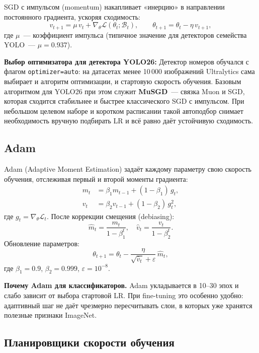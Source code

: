 \documentclass[10pt,a4paper]{report}
\numberwithin{equation}{chapter}
\numberwithin{figure}{chapter}
\numberwithin{table}{chapter}
\begin{document}
SGD с импульсом (momentum) накапливает «инерцию» в направлении
постоянного градиента, ускоряя сходимость:
\begin{equation}
  v_{t+1} = \mu\,v_t +
    \nabla_\theta\mathcal{L}(\theta_t;\mathcal{B}_t),
  \qquad
  \theta_{t+1} = \theta_t - \eta\,v_{t+1},
\end{equation}
где $\mu$~--- коэффициент импульса (типичное значение для
детекторов семейства YOLO~--- $\mu=0.937$).

\textbf{Выбор оптимизатора для детектора YOLO26:}
Детектор номеров обучался с флагом \texttt{optimizer=auto}: на датасетах
менее 10\,000 изображений Ultralytics сама выбирает и алгоритм
оптимизации, и стартовую скорость обучения. Базовым алгоритмом для
YOLO26 при этом служит \textbf{MuSGD}~--- связка Muon и SGD, которая
сходится стабильнее и быстрее классического SGD с импульсом. При
небольшом целевом наборе и коротком расписании такой автоподбор снимает
необходимость вручную подбирать LR и всё равно даёт устойчивую
сходимость.

\subsection{Adam}

Adam (Adaptive Moment Estimation) задаёт каждому параметру свою
скорость обучения, отслеживая первый и второй моменты градиента:
\begin{align}
  m_t &= \beta_1 m_{t-1} + (1-\beta_1)\,g_t, \\
  v_t &= \beta_2 v_{t-1} + (1-\beta_2)\,g_t^2,
\end{align}
где $g_t = \nabla_\theta\mathcal{L}_t$.
После коррекции смещения (debiasing):
\begin{equation}
  \hat{m}_t = \frac{m_t}{1-\beta_1^t},\quad
  \hat{v}_t = \frac{v_t}{1-\beta_2^t}.
\end{equation}
Обновление параметров:
\begin{equation}
  \theta_{t+1} = \theta_t -
    \frac{\eta}{\sqrt{\hat{v}_t}+\varepsilon}\,\hat{m}_t,
\end{equation}
где $\beta_1=0.9$, $\beta_2=0.999$, $\varepsilon=10^{-8}$.

\textbf{Почему Adam для классификаторов.}
Adam укладывается в 10--30 эпох и слабо зависит от выбора стартовой LR.
При fine-tuning это особенно удобно: адаптивный шаг не даёт чрезмерно
пересчитывать слои, в которых уже хранятся полезные признаки ImageNet.

\subsection{Планировщики скорости обучения}
\end{document}
